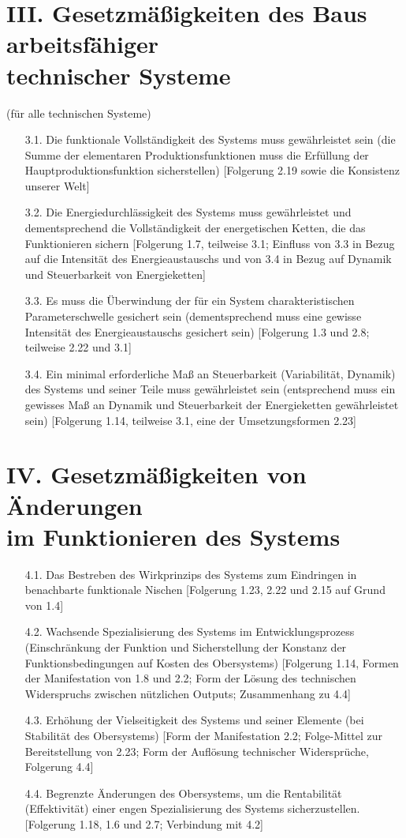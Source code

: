 \documentclass[11pt,a4paper]{article}
\begin{document}
\section*{III. Gesetzmäßigkeiten des Baus arbeitsfähiger\\ technischer
  Systeme}  
(für alle technischen Systeme)
\begin{itemize}
\item[3.1.] Die funktionale Vollständigkeit des Systems muss gewährleistet
  sein (die Summe der elementaren Produktionsfunktionen muss die Erfüllung der
  Hauptproduktionsfunktion sicherstellen) [Folgerung 2.19 sowie die Konsistenz
    unserer Welt]
\item[3.2.] Die Energiedurchlässigkeit des Systems muss gewährleistet und
  dementsprechend die Vollständigkeit der energetischen Ketten, die das
  Funktionieren sichern [Folgerung 1.7, teilweise 3.1; Einfluss von 3.3 in
    Bezug auf die Intensität des Energieaustauschs und von 3.4 in Bezug auf
    Dynamik und Steuerbarkeit von Energieketten]
\item[3.3.] Es muss die Überwindung der für ein System charakteristischen
  Parameterschwelle gesichert sein (dementsprechend muss eine gewisse
  Intensität des Energieaustauschs gesichert sein) [Folgerung 1.3 und 2.8;
    teilweise 2.22 und 3.1]
\item[3.4.] Ein minimal erforderliche Maß an Steuerbarkeit (Variabilität,
  Dynamik) des Systems und seiner Teile muss gewährleistet sein (entsprechend
  muss ein gewisses Maß an Dynamik und Steuerbarkeit der Energieketten
  gewährleistet sein) [Folgerung 1.14, teilweise 3.1, eine der
    Umsetzungsformen 2.23]
\end{itemize}
\section*{IV. Gesetzmäßigkeiten von Änderungen\\ im Funktionieren des Systems}
\begin{itemize}
\item[4.1.] Das Bestreben des Wirkprinzips des Systems zum Eindringen in
  benachbarte funktionale Nischen [Folgerung 1.23, 2.22 und 2.15 auf Grund von
    1.4]
\item[4.2.] Wachsende Spezialisierung des Systems im Entwicklungsprozess
  (Einschränkung der Funktion und Sicherstellung der Konstanz der
  Funktionsbedingungen auf Kosten des Obersystems) [Folgerung 1.14, Formen der
    Manifestation von 1.8 und 2.2; Form der Lösung des technischen
    Widerspruchs zwischen nützlichen Outputs; Zusammenhang zu 4.4]
\item[4.3.] Erhöhung der Vielseitigkeit des Systems und seiner Elemente (bei
  Stabilität des Obersystems) [Form der Manifestation 2.2; Folge-Mittel zur
    Bereitstellung von 2.23; Form der Auflösung technischer Widersprüche,
    Folgerung 4.4]
\item[4.4.] Begrenzte Änderungen des Obersystems, um die Rentabilität
  (Effektivität) einer engen Spezialisierung des Systems sicherzustellen.
  [Folgerung 1.18, 1.6 und 2.7; Verbindung mit 4.2]
\end{itemize}
\end{document}
